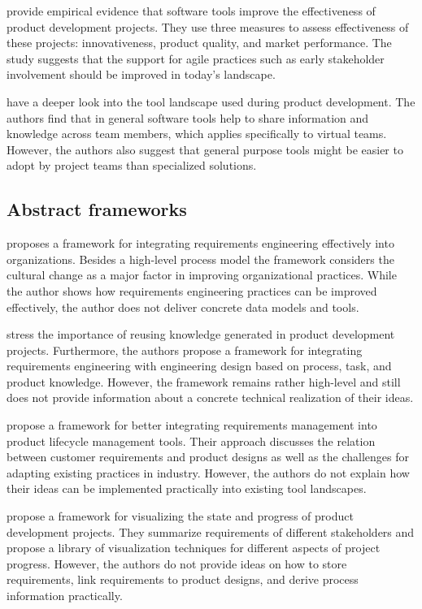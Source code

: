 \cite{DURMUSOGLU2011321} provide empirical evidence that software tools improve the effectiveness of product development projects.
They use three measures to assess effectiveness of these projects: innovativeness, product quality, and market performance.
The study suggests that the support for agile practices such as early stakeholder involvement should be improved in today's landscape.

\cite{marion_fixson_2019} have a deeper look into the tool landscape used during product development.
The authors find that in general software tools help to share information and knowledge across team members, which applies specifically to virtual teams.
However, the authors also suggest that general purpose tools might be easier to adopt by project teams than specialized solutions.

\subsection{Abstract frameworks}

\cite{Kauppinen2005} proposes a framework for integrating requirements engineering effectively into organizations.
Besides a high-level process model the framework considers the cultural change as a major factor in improving organizational practices.
While the author shows how requirements engineering practices can be improved effectively, the author does not deliver concrete data models and tools.

\cite{BAXTER2008585} stress the importance of reusing knowledge generated in product development projects.
Furthermore, the authors propose a framework for integrating requirements engineering with engineering design based on process, task, and product knowledge.
However, the framework remains rather high-level and still does not provide information about a concrete technical realization of their ideas.

\cite{Jorma2014} propose a framework for better integrating requirements management into product lifecycle management tools.
Their approach discusses the relation between customer requirements and product designs as well as the challenges for adapting existing practices in industry.
However, the authors do not explain how their ideas can be implemented practically into existing tool landscapes.

\cite{RICHTER2020271} propose a framework for visualizing the state and progress of product development projects.
They summarize requirements of different stakeholders and propose a library of visualization techniques for different aspects of project progress.
However, the authors do not provide ideas on how to store requirements, link requirements to product designs, and derive process information practically.

